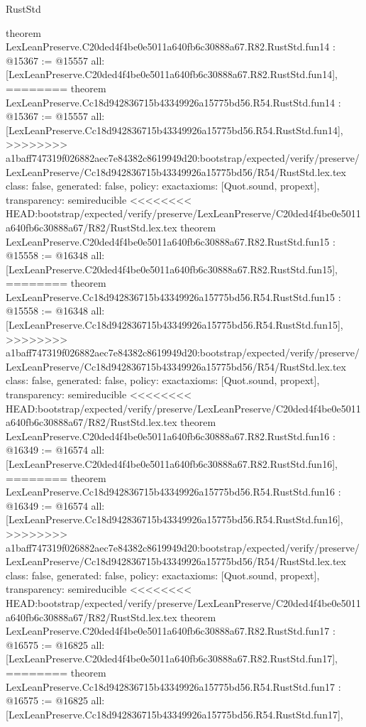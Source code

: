 \begin{lexlean}{RustStd}
\begin{coremodule}
{\begin{coremodule}
{{{{{{{{{{{{{{{{theorem LexLeanPreserve.C20ded4f4be0e5011a640fb6c30888a67.R82.RustStd.fun14 : @15367 := @15557 {
  all: [LexLeanPreserve.C20ded4f4be0e5011a640fb6c30888a67.R82.RustStd.fun14],
========
theorem LexLeanPreserve.Cc18d942836715b43349926a15775bd56.R54.RustStd.fun14 : @15367 := @15557 {
  all: [LexLeanPreserve.Cc18d942836715b43349926a15775bd56.R54.RustStd.fun14],
>>>>>>>> a1baff747319f026882aec7e84382c8619949d20:bootstrap/expected/verify/preserve/LexLeanPreserve/Cc18d942836715b43349926a15775bd56/R54/RustStd.lex.tex
  class: false,
  generated: false,
  policy: exact{axioms: [Quot.sound, propext]},
  transparency: semireducible
}
<<<<<<<< HEAD:bootstrap/expected/verify/preserve/LexLeanPreserve/C20ded4f4be0e5011a640fb6c30888a67/R82/RustStd.lex.tex
theorem LexLeanPreserve.C20ded4f4be0e5011a640fb6c30888a67.R82.RustStd.fun15 : @15558 := @16348 {
  all: [LexLeanPreserve.C20ded4f4be0e5011a640fb6c30888a67.R82.RustStd.fun15],
========
theorem LexLeanPreserve.Cc18d942836715b43349926a15775bd56.R54.RustStd.fun15 : @15558 := @16348 {
  all: [LexLeanPreserve.Cc18d942836715b43349926a15775bd56.R54.RustStd.fun15],
>>>>>>>> a1baff747319f026882aec7e84382c8619949d20:bootstrap/expected/verify/preserve/LexLeanPreserve/Cc18d942836715b43349926a15775bd56/R54/RustStd.lex.tex
  class: false,
  generated: false,
  policy: exact{axioms: [Quot.sound, propext]},
  transparency: semireducible
}
<<<<<<<< HEAD:bootstrap/expected/verify/preserve/LexLeanPreserve/C20ded4f4be0e5011a640fb6c30888a67/R82/RustStd.lex.tex
theorem LexLeanPreserve.C20ded4f4be0e5011a640fb6c30888a67.R82.RustStd.fun16 : @16349 := @16574 {
  all: [LexLeanPreserve.C20ded4f4be0e5011a640fb6c30888a67.R82.RustStd.fun16],
========
theorem LexLeanPreserve.Cc18d942836715b43349926a15775bd56.R54.RustStd.fun16 : @16349 := @16574 {
  all: [LexLeanPreserve.Cc18d942836715b43349926a15775bd56.R54.RustStd.fun16],
>>>>>>>> a1baff747319f026882aec7e84382c8619949d20:bootstrap/expected/verify/preserve/LexLeanPreserve/Cc18d942836715b43349926a15775bd56/R54/RustStd.lex.tex
  class: false,
  generated: false,
  policy: exact{axioms: [Quot.sound, propext]},
  transparency: semireducible
}
<<<<<<<< HEAD:bootstrap/expected/verify/preserve/LexLeanPreserve/C20ded4f4be0e5011a640fb6c30888a67/R82/RustStd.lex.tex
theorem LexLeanPreserve.C20ded4f4be0e5011a640fb6c30888a67.R82.RustStd.fun17 : @16575 := @16825 {
  all: [LexLeanPreserve.C20ded4f4be0e5011a640fb6c30888a67.R82.RustStd.fun17],
========
theorem LexLeanPreserve.Cc18d942836715b43349926a15775bd56.R54.RustStd.fun17 : @16575 := @16825 {
  all: [LexLeanPreserve.Cc18d942836715b43349926a15775bd56.R54.RustStd.fun17],
}}}}}}}}}}}}}}}}}}}}}
\end{coremodule}}
\end{coremodule}
\end{lexlean}
